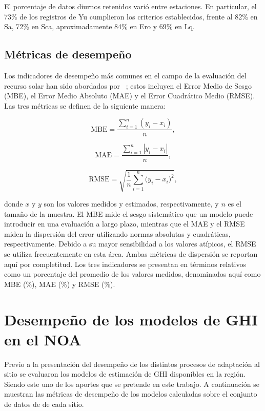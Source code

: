 El porcentaje de datos diurnos retenidos varió entre estaciones. En particular, el 73\% de los registros de Yu cumplieron los criterios establecidos, frente al 82\% en Sa, 72\% en Sca, aproximadamente 84\% en Ero y 69\% en Lq.





\subsection{Métricas de desempeño}

Los indicadores de desempeño más comunes en el campo de la evaluación del recurso solar han sido abordados por ~\cite{ZHANG}; estos incluyen el Error Medio de Sesgo (MBE), el Error Medio Absoluto (MAE) y el Error Cuadrático Medio (RMSE). Las tres métricas se definen de la siguiente manera:

\begin{equation}
\text{MBE} = \frac{\sum_{i=1}^{n} ( {y_i} - {x_i} ) }{n},
\end{equation}

\begin{equation}
\text{MAE} = \frac{\sum_{i=1}^{n} |{y_i} - {x_i} | }{n},
\end{equation}

\begin{equation}
\text{RMSE} = \sqrt{\frac{1}{n} \sum_{i=1}^{n} \Big({y_i - x_i}\Big)^2},
\label{ec:rrmsd}
\end{equation}

\noindent
donde $x$ y $y$ son los valores medidos y estimados, respectivamente, y $n$ es el tamaño de la muestra. El MBE mide el sesgo sistemático que un modelo puede introducir en una evaluación a largo plazo, mientras que el MAE y el RMSE miden la dispersión del error utilizando normas absolutas y cuadráticas, respectivamente. Debido a su mayor sensibilidad a los valores atípicos, el RMSE se utiliza frecuentemente en esta área. Ambas métricas de dispersión se reportan aquí por completitud. Los tres indicadores se presentan en términos relativos como un porcentaje del promedio de los valores medidos, denominados aquí como MBE (\%), MAE (\%) y RMSE (\%).




\section{Desempeño de los modelos de GHI en el NOA}
Previo a la presentación del desempeño de los distintos procesos de adaptación al sitio se evaluaron los modelos de estimación de GHI disponibles en la región. Siendo este uno de los aportes que se pretende en este trabajo. A continuación se muestran las métricas de desempeño de los modelos calculadas sobre el conjunto de datos de de cada sitio.



